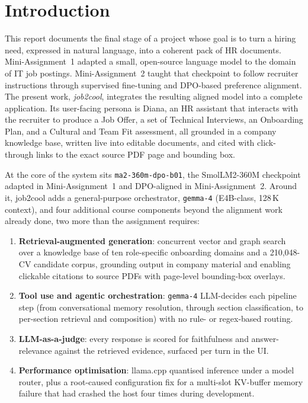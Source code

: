 \section{Introduction}

This report documents the final stage of a project whose goal is to turn a hiring
need, expressed in natural language, into a coherent pack of HR documents.
Mini-Assignment~1 adapted a small, open-source language model to the domain of IT job
postings. Mini-Assignment~2 taught that checkpoint to follow recruiter instructions
through supervised fine-tuning and DPO-based preference alignment. The present work,
\textit{job2cool}, integrates the resulting aligned model into a complete application.
Its user-facing persona is Diana, an HR assistant that interacts with the recruiter to
produce a Job Offer, a set of Technical Interviews, an Onboarding Plan, and a Cultural
and Team Fit assessment, all grounded in a company knowledge base, written live into
editable documents, and cited with click-through links to the exact source PDF page and
bounding box.

At the core of the system sits \verb|ma2-360m-dpo-b01|, the SmolLM2-360M checkpoint
adapted in Mini-Assignment~1 and DPO-aligned in Mini-Assignment~2. Around it, job2cool
adds a general-purpose orchestrator, \verb|gemma-4| (E4B-class, 128\,K context), and four
additional course components beyond the alignment work already done, two more than the
assignment requires:

\begin{enumerate}
  \item \textbf{Retrieval-augmented generation}: concurrent vector and graph search
    over a knowledge base of ten role-specific onboarding domains and a 210,048-CV
    candidate corpus, grounding output in company material and enabling clickable
    citations to source PDFs with page-level bounding-box overlays.
  \item \textbf{Tool use and agentic orchestration}: \verb|gemma-4| LLM-decides each
    pipeline step (from conversational memory resolution, through section
    classification, to per-section retrieval and composition) with no rule- or
    regex-based routing.
  \item \textbf{LLM-as-a-judge}: every response is scored for faithfulness and
    answer-relevance against the retrieved evidence, surfaced per turn in the UI.
  \item \textbf{Performance optimisation}: llama.cpp quantised inference under a model
    router, plus a root-caused configuration fix for a multi-slot KV-buffer memory
    failure that had crashed the host four times during development.
\end{enumerate}

